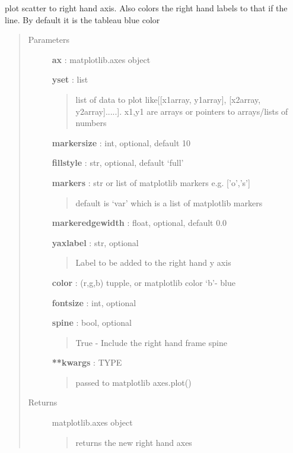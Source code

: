 \documentclass[letterpaper,10pt,english]{sphinxmanual}
\begin{document}
\begin{fulllineitems}
\label{pubplots:pubplots.plot.plot_sright}
plot scatter to right hand axis. Also colors the right hand labels to that if the line. By
default it is the tableau blue color
\begin{quote}\begin{description}
\item[{Parameters}] \leavevmode
\textbf{ax} : matplotlib.axes object

\textbf{yset} : list
\begin{quote}

list of data to plot like{[}{[}x1array, y1array{]}, {[}x2array, y2array{]}.....{]}.
x1,y1 are arrays or pointers to arrays/lists of numbers
\end{quote}

\textbf{markersize} : int, optional, default 10

\textbf{fillstyle} : str, optional, default `full'

\textbf{markers} : str or list of matplotlib markers e.g. {[}'o','s'{]}
\begin{quote}

default is `var' which is a list of matplotlib markers
\end{quote}

\textbf{markeredgewidth} : float, optional, default 0.0

\textbf{yaxlabel} : str, optional
\begin{quote}

Label to be added to the right hand y axis
\end{quote}

\textbf{color} : (r,g,b) tupple, or matplotlib color `b'- blue

\textbf{fontsize} : int, optional

\textbf{spine} : bool, optional
\begin{quote}

True - Include the right hand frame spine
\end{quote}

\textbf{**kwargs} : TYPE
\begin{quote}

passed to matplotlib axes.plot()
\end{quote}

\item[{Returns}] \leavevmode
matplotlib.axes object
\begin{quote}

returns the new right hand axes
\end{quote}

\end{description}\end{quote}

\end{fulllineitems}
\end{document}
